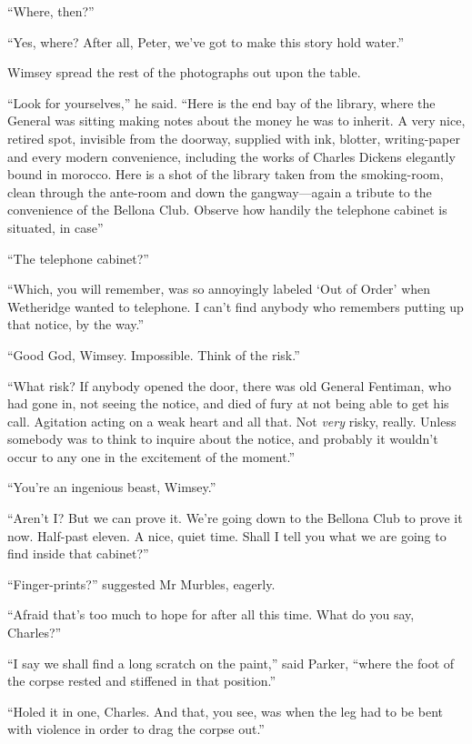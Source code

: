 \enquote{Where, then?}

\enquote{Yes, where? After all, Peter, we've got to make this story hold water.}

Wimsey spread the rest of the photographs out upon the table.

\enquote{Look for yourselves,} he said. \enquote{Here is the end bay of the library, where the General was sitting making notes about the money he was to inherit. A very nice, retired spot, invisible from the doorway, supplied with ink, blotter, writing-paper and every modern convenience, including the works of Charles Dickens elegantly bound in morocco. Here is a shot of the library taken from the smoking-room, clean through the ante-room and down the gangway\allowbreak---\allowbreak again a tribute to the convenience of the Bellona Club. Observe how handily the telephone cabinet is situated, in case\longdash}

\enquote{The telephone cabinet?}

\enquote{Which, you will remember, was so annoyingly labeled \enquote{Out of Order} when Wetheridge wanted to telephone. I can't find anybody who remembers putting up that notice, by the way.}

\enquote{Good God, Wimsey. Impossible. Think of the risk.}

\enquote{What risk? If anybody opened the door, there was old General Fentiman, who had gone in, not seeing the notice, and died of fury at not being able to get his call. Agitation acting on a weak heart and all that. Not \textit{very} risky, really. Unless somebody was to think to inquire about the notice, and probably it wouldn't occur to any one in the excitement of the moment.}

\enquote{You're an ingenious beast, Wimsey.}

\enquote{Aren't I? But we can prove it. We're going down to the Bellona Club to prove it now. Half-past eleven. A nice, quiet time. Shall I tell you what we are going to find inside that cabinet?}

\enquote{Finger-prints?} suggested Mr Murbles, eagerly.

\enquote{Afraid that's too much to hope for after all this time. What do you say, Charles?}

\enquote{I say we shall find a long scratch on the paint,} said Parker, \enquote{where the foot of the corpse rested and stiffened in that position.}

\enquote{Holed it in one, Charles. And that, you see, was when the leg had to be bent with violence in order to drag the corpse out.}

